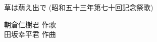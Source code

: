﻿\documentclass[10pt,a5j]{tarticle} %
\begin{document}
\thispagestyle{empty} %
\newcommand{\linespace}{1.8em} %
\newcommand{\blocksize}{0.33\hsize} %

\begin{minipage}[c]{0.7\hsize}
	\begin{center}
		{\LARGE
			草は萠え出で
		}
		{\small 
			(昭和五十三年第七十回記念祭歌)
		}\\
	\end{center}
\end{minipage}
\begin{minipage}[c]{0.3\hsize}
	\begin{flushright}%
		朝倉仁樹君 作歌\\
		田坂幸平君 作曲
	\end{flushright}
\end{minipage}
\end{document}
